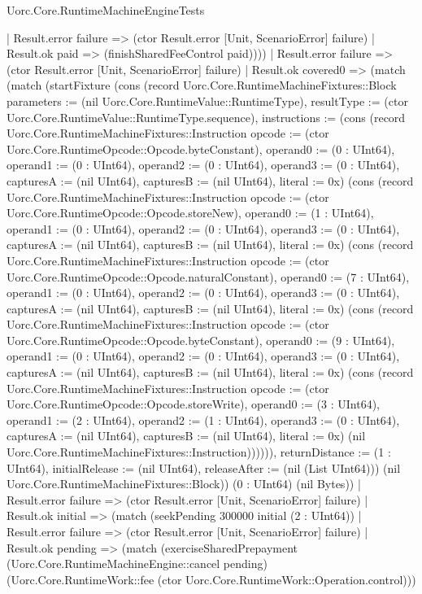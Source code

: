 \begin{lexlean}{Uorc.Core.RuntimeMachineEngineTests}
\begin{semanticmodule}
{          | Result.error failure => (ctor Result.error [Unit, ScenarioError] failure)
          | Result.ok paid => (finishSharedFeeControl paid))))
    | Result.error failure => (ctor Result.error [Unit, ScenarioError] failure)
    | Result.ok covered0 => (match (match (startFixture (cons (record Uorc.Core.RuntimeMachineFixtures::Block {parameters := (nil Uorc.Core.RuntimeValue::RuntimeType), resultType := (ctor Uorc.Core.RuntimeValue::RuntimeType.sequence), instructions := (cons (record Uorc.Core.RuntimeMachineFixtures::Instruction {opcode := (ctor Uorc.Core.RuntimeOpcode::Opcode.byteConstant), operand0 := (0 : UInt64), operand1 := (0 : UInt64), operand2 := (0 : UInt64), operand3 := (0 : UInt64), capturesA := (nil UInt64), capturesB := (nil UInt64), literal := 0x}) (cons (record Uorc.Core.RuntimeMachineFixtures::Instruction {opcode := (ctor Uorc.Core.RuntimeOpcode::Opcode.storeNew), operand0 := (1 : UInt64), operand1 := (0 : UInt64), operand2 := (0 : UInt64), operand3 := (0 : UInt64), capturesA := (nil UInt64), capturesB := (nil UInt64), literal := 0x}) (cons (record Uorc.Core.RuntimeMachineFixtures::Instruction {opcode := (ctor Uorc.Core.RuntimeOpcode::Opcode.naturalConstant), operand0 := (7 : UInt64), operand1 := (0 : UInt64), operand2 := (0 : UInt64), operand3 := (0 : UInt64), capturesA := (nil UInt64), capturesB := (nil UInt64), literal := 0x}) (cons (record Uorc.Core.RuntimeMachineFixtures::Instruction {opcode := (ctor Uorc.Core.RuntimeOpcode::Opcode.byteConstant), operand0 := (9 : UInt64), operand1 := (0 : UInt64), operand2 := (0 : UInt64), operand3 := (0 : UInt64), capturesA := (nil UInt64), capturesB := (nil UInt64), literal := 0x}) (cons (record Uorc.Core.RuntimeMachineFixtures::Instruction {opcode := (ctor Uorc.Core.RuntimeOpcode::Opcode.storeWrite), operand0 := (3 : UInt64), operand1 := (2 : UInt64), operand2 := (1 : UInt64), operand3 := (0 : UInt64), capturesA := (nil UInt64), capturesB := (nil UInt64), literal := 0x}) (nil Uorc.Core.RuntimeMachineFixtures::Instruction)))))), returnDistance := (1 : UInt64), initialRelease := (nil UInt64), releaseAfter := (nil (List UInt64))}) (nil Uorc.Core.RuntimeMachineFixtures::Block)) (0 : UInt64) (nil Bytes))
        | Result.error failure => (ctor Result.error [Unit, ScenarioError] failure)
        | Result.ok initial => (match (seekPending 300000 initial (2 : UInt64))
          | Result.error failure => (ctor Result.error [Unit, ScenarioError] failure)
          | Result.ok pending => (match (exerciseSharedPrepayment (Uorc.Core.RuntimeMachineEngine::cancel pending) (Uorc.Core.RuntimeWork::fee (ctor Uorc.Core.RuntimeWork::Operation.control)))
}
\end{semanticmodule}
\end{lexlean}
